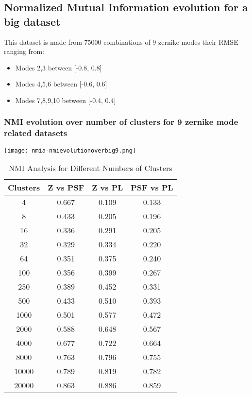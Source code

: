 \subsection{Normalized Mutual Information evolution for a big dataset}
	
	This dataset is made from 75000 combinations of 9 zernike modes their RMSE ranging from:
	\begin{itemize}
		\item Modes 2,3 between [-0.8, 0.8]
		\item Modes 4,5,6 between [-0.6, 0.6]
		\item Modes 7,8,9,10 between [-0.4, 0.4]
	\end{itemize}
	
	\subsubsection{NMI evolution over number of clusters for 9 zernike mode related datasets}
		\begin{figure*}[ht!]
			\centering
			\texttt{[image: nmia-nmievolutionoverbig9.png]}
		\end{figure*}
		
\begin{table}[h!]
\centering
\begin{tabular}{|c|c|c|c|}
\hline
\textbf{Clusters} & \textbf{Z vs PSF} & \textbf{Z vs PL} & \textbf{PSF vs PL} \\
\hline
4 & 0.667 & 0.109 & 0.133 \\
8 & 0.433 & 0.205 & 0.196 \\
16 & 0.336 & 0.291 & 0.205 \\
32 & 0.329 & 0.334 & 0.220 \\
64 & 0.351 & 0.375 & 0.240 \\
100 & 0.356 & 0.399 & 0.267 \\
250 & 0.389 & 0.452 & 0.331 \\
500 & 0.433 & 0.510 & 0.393 \\
1000 & 0.501 & 0.577 & 0.472 \\
2000 & 0.588 & 0.648 & 0.567 \\
4000 & 0.677 & 0.722 & 0.664 \\
8000 & 0.763 & 0.796 & 0.755 \\
10000 & 0.789 & 0.819 & 0.782 \\
20000 & 0.863 & 0.886 & 0.859 \\
\hline
\end{tabular}
\caption{NMI Analysis for Different Numbers of Clusters}
\end{table}